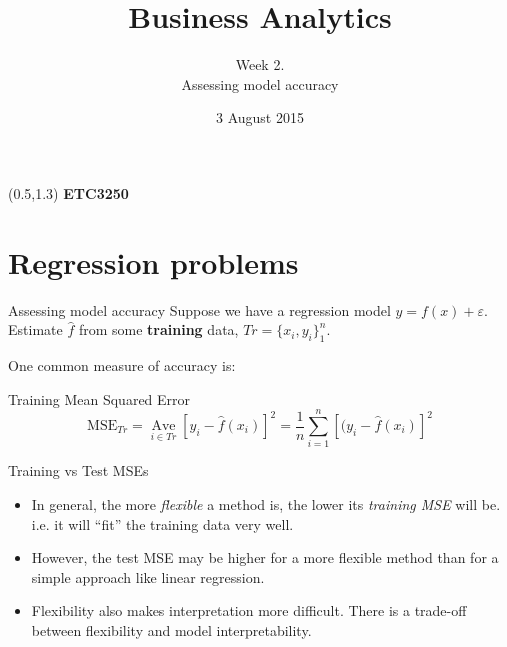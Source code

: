 \documentclass[14pt]{beamer}
\title[Statistical learning]{Business Analytics}
\author{Week 2.\\ Assessing model accuracy}
\date{3 August 2015}
\begin{document}
\begin{frame}[plain]{}
\maketitle
\begin{textblock}{11}(0.5,1.3){\color{white}\large
\textbf{ETC3250}}
\end{textblock}


\end{frame}

\section{Regression problems}

\begin{frame}{Assessing model accuracy}
Suppose we have a regression model $y=f(x)+\varepsilon$. Estimate
$\hat{f}$ from some \textbf{training} data, $Tr=\{x_i,y_i\}_1^n$.

One common measure of accuracy is:
\begin{block}{Training Mean Squared Error}
\[
\text{MSE}_{Tr} = \mathop{\text{Ave}}\limits_{i\in Tr}[y_i-\hat{f}(x_i)]^2 =
\frac{1}{n}\sum_{i=1}^n [(y_i-\hat{f}(x_i)]^2
\]
\end{block}
\pause



\vspace*{10cm}

\end{frame}
\begin{frame}{Training vs Test MSEs}
\begin{itemize}
\item In general, the more \emph{flexible} a method is, the lower its
\emph{training MSE} will be. i.e. it will “fit” the training data very well.

\item However, the test MSE may be higher for a more flexible method than for a simple approach like linear regression. 

\item Flexibility also makes interpretation more difficult. There is
a trade-off between flexibility and model interpretability.
\end{itemize}
\end{frame}
\end{document}
